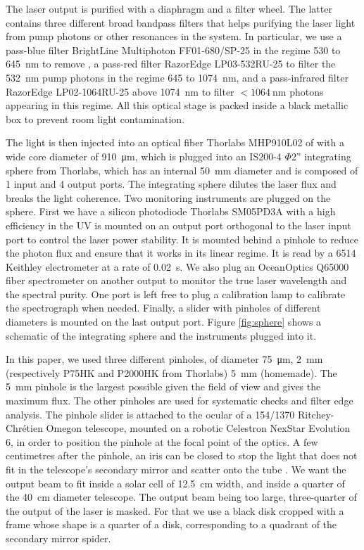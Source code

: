 The laser output is purified with a diaphragm and a filter wheel. The latter contains three different broad bandpass filters that helps purifying the laser light from pump photons or other resonances in the system. In particular, we use a pass-blue filter BrightLine Multiphoton FF01-680/SP-25 in the regime 530 to \SI{645}{\nano\meter} to remove , a pass-red filter RazorEdge LP03-532RU-25 to filter the \SI{532}{\nano\meter} pump photons in the regime 645 to \SI{1074}{\nano\meter}, and a pass-infrared filter RazorEdge LP02-1064RU-25 above \SI{1074}{\nano\meter} to filter $<\SI{1064}{\nano\meter}$ photons appearing in this regime. All this optical stage is packed inside a black metallic box to prevent room light contamination.

The light is then injected into an optical fiber Thorlabs MHP910L02 of with a wide core diameter of \SI{910}{\micro\meter}, which is plugged into an IS200-4 $\Phi$2'' integrating sphere from Thorlabs, which has an internal \SI{50}{\mm} diameter and is composed of 1 input and 4 output ports. The integrating sphere dilutes the laser flux and breaks the light coherence. Two monitoring instruments are plugged on the sphere. First we have a silicon photodiode Thorlabs SM05PD3A with a high efficiency in the UV is mounted on an output port orthogonal to the laser input port to control the laser power stability. It is mounted behind a pinhole to reduce the photon flux and ensure that it works in its linear regime. It is read by a 6514 Keithley electrometer at a rate of \SI{0.02}{\second}. We also plug an OceanOptics Q65000 fiber spectrometer on another output to monitor the true laser wavelength and the spectral purity. One port is left free to plug a calibration lamp to calibrate the spectrograph when needed. Finally, a slider with pinholes of different diameters is mounted on the last output port. Figure \ref{fig:sphere} shows a schematic of the integrating sphere and the instruments plugged into it.

In this paper, we used three different pinholes, of diameter \SI{75}{\micro\meter}, \SI{2}{\milli\meter} (respectively P75HK and P2000HK from Thorlabs) \SI{5}{\milli\meter} (homemade). The \SI{5}{\mm} pinhole is the largest possible given the \SD field of view and gives the maximum flux. The other pinholes are used for systematic checks and filter edge analysis. The pinhole slider is attached to the ocular of a 154/1370 Ritchey-Chrétien Omegon telescope, mounted on a robotic Celestron NexStar Evolution 6, in order to position the pinhole at the focal point of the optics. A few centimetres after the pinhole, an iris can be closed to stop the light that does not fit in the telescope's secondary mirror and scatter onto the tube . We want the output beam to fit inside a solar cell of \SI{12.5}{\cm} width, and inside a quarter of the \SD \SI{40}{\cm} diameter telescope. The output beam being too large, three-quarter of the output of the laser is masked. For that we use a black disk cropped with a frame whose shape is a quarter of a disk, corresponding to a quadrant of the secondary mirror spider. 

